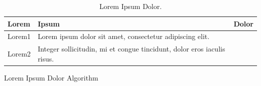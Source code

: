 \begin{table}[ht!]\renewcommand\arraystretch{1.4}
    \centering
    \begin{tabular}{p{}p{}p{}}
    \toprule
         \textbf{Lorem} & \textbf{Ipsum} & \textbf{Dolor} \\
         \midrule
         Lorem1 & Lorem ipsum dolor sit amet, consectetur adipiscing elit. & \cite{reference}\\ 
         Lorem2 & Integer sollicitudin, mi et congue tincidunt, dolor eros iaculis risus. & \cite{reference}\\
         \bottomrule
    \end{tabular}
    \caption{Lorem Ipsum Dolor.}
    \label{tab:lorem_ipsum}
\end{table}

\providecommand{\SetAlgoLined}{\SetLine}
\providecommand{\DontPrintSemicolon}{\dontprintsemicolon}
\begin{algorithm}[h!]
\SetAlgoLined
{}
\DontPrintSemicolon

\caption{Lorem Ipsum Dolor Algorithm}\label{algorithm:lorem}
\end{algorithm}









